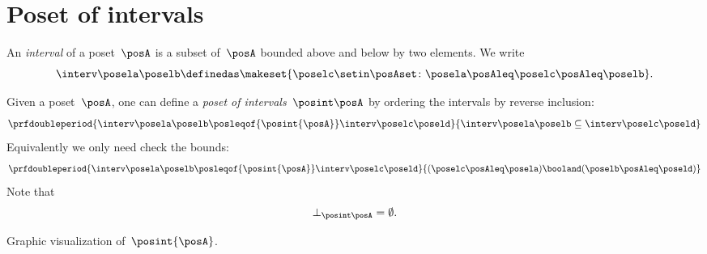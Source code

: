 
\section{Poset of intervals}
\begin{definition}[Interval]
    \label{def:interval}
    An \emph{interval} of a poset~$\posA$ is a subset of~$\posA$ bounded above and below by two elements.
    We write
    \begin{equation*}
        \interv \posela \poselb
        \definedas
        \makeset{
            \poselc \setin \posAset \colon
            \posela \posAleq \poselc \posAleq \poselb
        }.
    \end{equation*}
\end{definition}

\begin{definition}
    \label{def:poset_intervals}
    Given a poset~$\posA$, one can define a \emph{poset of intervals}~$\posint\posA$
    by ordering the intervals by reverse inclusion:
    \begin{equation*}
        \prfdoubleperiod{
            \interv \posela \poselb
            \posleqof{\posint{\posA}}
            \interv \poselc \poseld
        }{
            \interv \posela \poselb
            \subseteq
            \interv \poselc \poseld
        }
    \end{equation*}
    Equivalently we only need check the bounds:
    \begin{equation*}
        \prfdoubleperiod{
            \interv \posela \poselb
            \posleqof{\posint{\posA}}
            \interv \poselc \poseld
        }{
            (\poselc \posAleq \posela ) \booland (\poselb \posAleq \poseld)
        }
    \end{equation*}
    Note that
    \begin{equation*}
        \bot_{\posint \posA} = \emptyset.
    \end{equation*}
\end{definition}

\begin{marginfigure}
    \begin{center}
    \end{center}
    \caption{Graphic visualization of~$\posint{\posA}$.
    }
\end{marginfigure}

